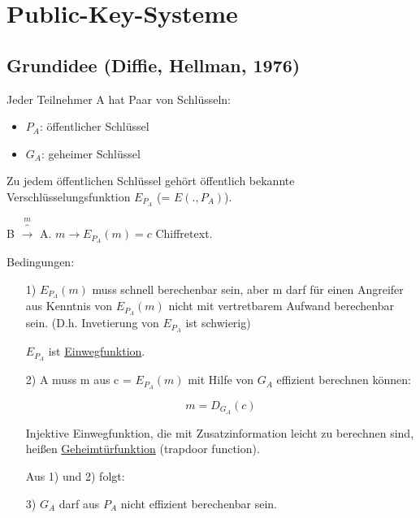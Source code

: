 \chapter{Public-Key-Systeme}

\section{Grundidee (Diffie, Hellman, 1976)}

Jeder Teilnehmer A hat Paar von Schlüsseln:

\begin{itemize}
  \item $P_A$: öffentlicher Schlüssel
  \item $G_A$: geheimer Schlüssel
\end{itemize}

Zu jedem öffentlichen Schlüssel gehört öffentlich bekannte Verschlüsselungsfunktion $E_{P_A}$ (= $E(., P_A)$).

\par \medskip

B $\overbrace{\rightarrow}^{m}$ A. $m \rightarrow E_{P_A}(m) = c$ Chiffretext.

\par \medskip

Bedingungen:

\begin{enumerate}
  \item[1)] $E_{P_A}(m)$ muss schnell berechenbar sein, aber m darf für einen Angreifer aus Kenntnis von $E_{P_A}(m)$ nicht mit vertretbarem Aufwand berechenbar sein. (D.h. Invetierung von $E_{P_A}$ ist schwierig)

  $E_{P_A}$ ist \underline{Einwegfunktion}.

  \item[2)] A muss m aus c = $E_{P_A}(m)$ mit Hilfe von $G_A$ effizient berechnen können:

  \begin{equation}
    m = D_{G_A}(c)
  \end{equation}

  Injektive Einwegfunktion, die mit Zusatzinformation leicht zu berechnen sind, heißen \underline{Geheimtürfunktion} (trapdoor function).

  Aus 1) und 2) folgt:

  \item[3)] $G_A$ darf aus $P_A$ nicht effizient berechenbar sein.
\end{enumerate}

